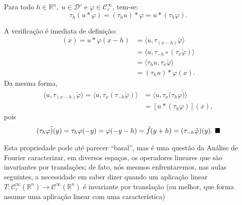 \documentclass[../distribution_theory_notes.tex]{subfiles}
\begin{document}
\begin{prop*}
	Para todo \(h\in \mathbb{R}^{n},\; u\in \mathcal{D}'\) e \(\varphi \in \mathcal{C}_{c}^{\infty}\), tem-se:
	\[
		\tau_{h}(u*\varphi )=(\tau_{h}u)*\varphi = u*(\tau_{h}\varphi ).
	\]
\end{prop*}
\begin{proof*}
	A verificação é imediata de definição:
	\begin{align*}
		[\tau_{h}(u*\varphi )](x) = u * \varphi (x-h) & = \langle u, \tau_{(x-h)}\check{\varphi } \rangle              \\
		                                              & = \langle u, \tau_{-h}\circ (\tau_{x}\check{\varphi }) \rangle \\
		                                              & = \langle \tau_{h}u, \tau_{x}\check{\varphi } \rangle          \\
		                                              & = (\tau_{h}u)*\varphi (x).
	\end{align*}
	Da mesma forma,
	\begin{align*}
		\langle u, \tau_{(x-h)}\check{\varphi } \rangle = \langle u, \tau_{x}(\tau_{-h}\check{\varphi }) \rangle & = \langle u, \tau_{x}(\tau_{h}\varphi \check{)} \rangle \\
		                                                                                                         & = [u*(\tau_{h}\varphi )](x),
	\end{align*}
	pois
	\[
		(\tau_{h}\varphi \check{)}(y)=\tau_{h}\varphi (-y)=\varphi (-y-h)=\check{f}(y+h)=(\tau_{-h}\check{\varphi })(y). \text{ $\blacksquare$}
	\]
\end{proof*}
Esta propriedade pode até parecer ``basal'', mas é uma questão da Análise de Fourier caracterizar, em diversos espaços, os operadores lineares que são invariantes por translações; de fato, nós mesmos enfrentaremos, nas aulas seguintes, a necessidade em saber dizer quando um aplicação linear \(T:\mathcal{C}_{c}^{\infty}(\mathbb{R}^{n})\rightarrow \mathcal{C}^{\infty}(\mathbb{R}^{n})\) é invariante por translação (ou melhor, que forma assume uma aplicação linear com uma característica)
\end{document}
